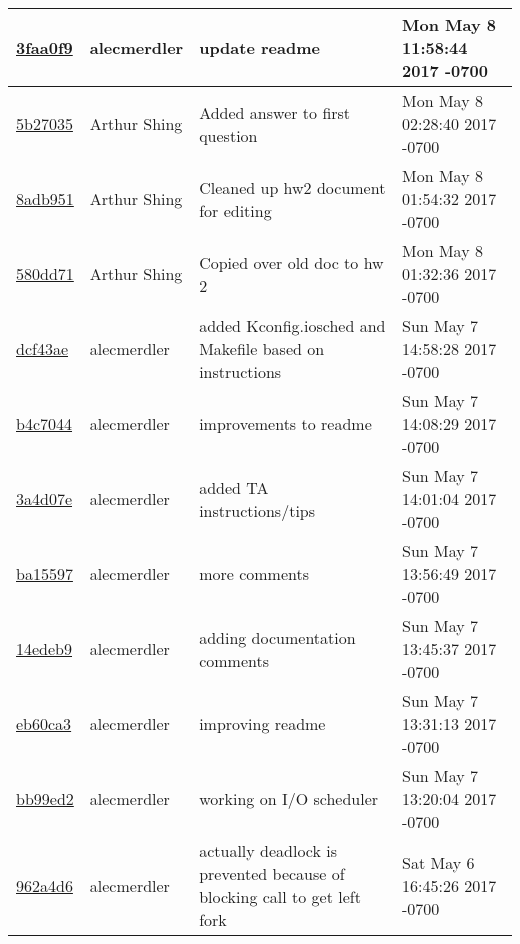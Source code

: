\begin{tabular}{l l l l}
\href{https://github.com/alecmerdler/cs-444-group-119/commit/3faa0f9b30d0c483072dd175ee44914f4d44bc50}{3faa0f9} & alecmerdler & update readme & Mon May 8 11:58:44 2017 -0700\\\hline
\href{https://github.com/alecmerdler/cs-444-group-119/commit/5b27035b75b0a19f72ebf65f69aaf39e4248cea6}{5b27035} & Arthur Shing & Added answer to first question & Mon May 8 02:28:40 2017 -0700\\\hline
\href{https://github.com/alecmerdler/cs-444-group-119/commit/8adb95101e281849bf0a4302cc6cd14758bfbf56}{8adb951} & Arthur Shing & Cleaned up hw2 document for editing & Mon May 8 01:54:32 2017 -0700\\\hline
\href{https://github.com/alecmerdler/cs-444-group-119/commit/580dd714debbddba5d1bd94735ce59f269b24843}{580dd71} & Arthur Shing & Copied over old doc to hw 2 & Mon May 8 01:32:36 2017 -0700\\\hline
\href{https://github.com/alecmerdler/cs-444-group-119/commit/dcf43aea0a4a1c8e570394621cfb964ebc77ef02}{dcf43ae} & alecmerdler & added Kconfig.iosched and Makefile based on instructions & Sun May 7 14:58:28 2017 -0700\\\hline
\href{https://github.com/alecmerdler/cs-444-group-119/commit/b4c7044841e68579e335765d3370e40c4a786d8b}{b4c7044} & alecmerdler & improvements to readme & Sun May 7 14:08:29 2017 -0700\\\hline
\href{https://github.com/alecmerdler/cs-444-group-119/commit/3a4d07e9b71c259707f8763e93c01e7cddaf22b0}{3a4d07e} & alecmerdler & added TA instructions/tips & Sun May 7 14:01:04 2017 -0700\\\hline
\href{https://github.com/alecmerdler/cs-444-group-119/commit/ba155971591102e6b565e64634339b87b2c09268}{ba15597} & alecmerdler & more comments & Sun May 7 13:56:49 2017 -0700\\\hline
\href{https://github.com/alecmerdler/cs-444-group-119/commit/14edeb950fb33b0c392677ef4e68fec961602354}{14edeb9} & alecmerdler & adding documentation comments & Sun May 7 13:45:37 2017 -0700\\\hline
\href{https://github.com/alecmerdler/cs-444-group-119/commit/eb60ca356c9e4058a4477fcb159f83bf73349172}{eb60ca3} & alecmerdler & improving readme & Sun May 7 13:31:13 2017 -0700\\\hline
\href{https://github.com/alecmerdler/cs-444-group-119/commit/bb99ed237ceb79f1dd6b9ecfbb7447430c285fa4}{bb99ed2} & alecmerdler & working on I/O scheduler & Sun May 7 13:20:04 2017 -0700\\\hline
\href{https://github.com/alecmerdler/cs-444-group-119/commit/962a4d6b35cd24668972f637ae7bdd615edf0093}{962a4d6} & alecmerdler & actually deadlock is prevented because of blocking call to get left fork & Sat May 6 16:45:26 2017 -0700\\\hline

\end{tabular}
